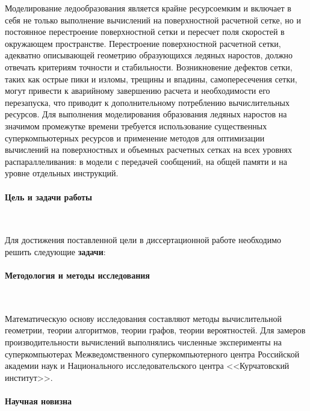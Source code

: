 \documentclass[a4paper,14pt]{extarticle}                     %
\theoremstyle{plain}                                         %
\begin{document}
Моделирование ледообразования является крайне ресурсоемким и включает в себя не только выполнение вычислений на поверхностной расчетной сетке, но и постоянное перестроение поверхностной сетки и пересчет поля скоростей в окружающем пространстве.
Перестроение поверхностной расчетной сетки, адекватно описывающей геометрию образующихся ледяных наростов, должно отвечать критериям точности и стабильности.
Возникновение дефектов сетки, таких как острые пики и изломы, трещины и впадины, самопересечения сетки, могут привести к аварийному завершению расчета и необходимости его перезапуска, что приводит к дополнительному потреблению вычислительных ресурсов. 
Для выполнения моделирования образования ледяных наростов на значимом промежутке времени требуется использование существенных суперкомпьютерных ресурсов и применение методов для оптимизации вычислений на поверхностных и объемных расчетных сетках на всех уровнях распараллеливания: в модели с передачей сообщений, на общей памяти и на уровне отдельных инструкций.

\paragraph{Цель и задачи работы} \



Для достижения поставленной цели в диссертационной работе необходимо решить следующие \textbf{задачи}:
\begin{enumerate}[noitemsep,topsep=0pt,parsep=0pt,partopsep=0pt]

\end{enumerate}

\paragraph{Методология и методы исследования} \

Математическую основу исследования составляют методы вычислительной геометрии, теории алгоритмов, теории графов, теории вероятностей.
Для замеров производительности вычислений выполнялись численные эксперименты на суперкомпьютерах Межведомственного суперкомпьютерного центра Российской академии наук и Национального исследовательского центра <<Курчатовский институт>>.

\paragraph{Научная новизна} \
\begin{itemize}[noitemsep,topsep=0pt,parsep=0pt,partopsep=0pt]

\end{itemize}
\end{document}
